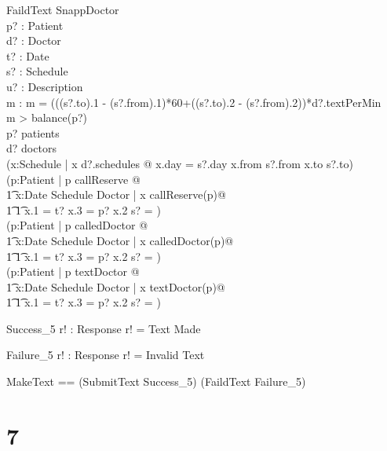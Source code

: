 \documentclass{article}
\begin{document}
\begin{schema}{FaildText}
\Xi SnappDoctor\\
p? : Patient\\
d? : Doctor\\
t? : Date\\
s? : Schedule\\
u? : Description\\
m : \nat
\where
m = (((s?.to).1 - (s?.from).1)*60+((s?.to).2 - (s?.from).2))*d?.textPerMin \\
m > balance(p?) \lor \\
p? \notin patients \lor \\
d? \notin doctors \lor \\
\neg (\exists x:Schedule | x \in d?.schedules @ x.day = s?.day \land x.from \le s?.from \land x.to \ge s?.to) \lor\\
\neg (\forall p:Patient | p \in callReserve @ \\
\t1 \forall x:Date \cross Schedule \cross Doctor | x \in callReserve(p)@\\
\t1 \t1 x.1 = t? \land x.3 = p? \implies x.2 \cap s? = \emptyset) \lor \\
\neg(\forall p:Patient | p \in calledDoctor @ \\
\t1 \forall x:Date \cross Schedule \cross Doctor | x \in calledDoctor(p)@\\
\t1 \t1 x.1 = t? \land x.3 = p? \implies x.2 \cap s? = \emptyset)\lor\\
\neg(\forall p:Patient | p \in textDoctor @ \\
\t1 \forall x:Date \cross Schedule \cross Doctor | x \in textDoctor(p)@\\
\t1 \t1 x.1 = t? \land x.3 = p? \implies x.2 \cap s? = \emptyset)
\end{schema}

\begin{schema}{Success_5}
r! : Response
\where
r! = Text Made
\end{schema}

\begin{schema}{Failure_5}
r! : Response
\where
r! = Invalid Text
\end{schema}

\begin{zed}
MakeText == (SubmitText \land Success_5) \lor (FaildText \land Failure_5)
\end{zed}

\section*{7}
\end{document}
